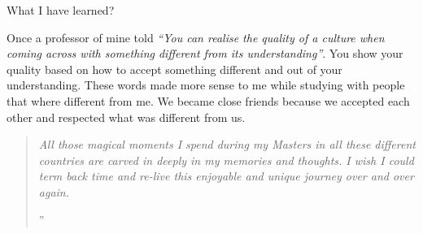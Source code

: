 \documentclass[10pt,a4paper]{article} %
\newcommand{\NewsItem}[1]{ %
\usefont{T1}{fvs}{n}{n} %
\vspace{24pt}\large #1\vspace{3pt} %
\par \normalsize \normalfont}
\begin{document}
\begin{multicols}{3}
\NewsItem{What I have learned?}

Once a professor of mine told \textit{``You can realise the 
	quality of a culture when coming across with something different 
	from its understanding''}. 
You show your quality based on how to accept something different and 
out of your understanding.
These words made more sense to me while studying with people that where different 
from me. 
We became close friends because we accepted each other and respected what was 
different from us. 
 




\begin{quotation} %

\noindent\normalsize\textit{All those magical moments I spend during my 
	Masters in all these different countries are carved in deeply in my 
	memories and thoughts. 
	I wish I could term back time and re-live this enjoyable and unique 
	journey over and over again.
}

\hfill{\Huge''}

\end{quotation}


\end{multicols}


\end{document}
